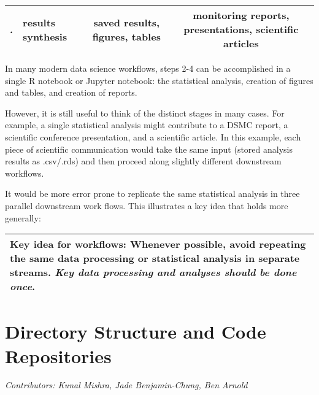 \documentclass[
]{book}
\begin{document}
\begin{longtable}[]{@{}clcc@{}}
\begin{minipage}[t]{0.07\columnwidth}
.\strut
\end{minipage} & \begin{minipage}[t]{0.25\columnwidth}\raggedright
results synthesis\strut
\end{minipage} & \begin{minipage}[t]{0.28\columnwidth}\centering
saved results, figures, tables\strut
\end{minipage} & \begin{minipage}[t]{0.29\columnwidth}\centering
monitoring reports, presentations, scientific articles\strut
\end{minipage}\tabularnewline
\bottomrule
\end{longtable}

In many modern data science workflows, steps 2-4 can be accomplished in a single R notebook or Jupyter notebook: the statistical analysis, creation of figures and tables, and creation of reports.

However, it is still useful to think of the distinct stages in many cases. For example, a single statistical analysis might contribute to a DSMC report, a scientific conference presentation, and a scientific article. In this example, each piece of scientific communication would take the same input (stored analysis results as .csv/.rds) and then proceed along slightly different downstream workflows.

It would be more error prone to replicate the same statistical analysis in three parallel downstream work flows. This illustrates a key idea that holds more generally:

\begin{longtable}[]{@{}l@{}}
\toprule
\endhead
\textbf{Key idea for workflows:} Whenever possible, avoid repeating the same data processing or statistical analysis in separate streams. \emph{Key data processing and analyses should be done once}.\tabularnewline
\bottomrule
\end{longtable}

\hypertarget{directory-structure-and-code-repositories}{%
\chapter{Directory Structure and Code Repositories}\label{directory-structure-and-code-repositories}}

\emph{Contributors: Kunal Mishra, Jade Benjamin-Chung, Ben Arnold}
\end{document}
